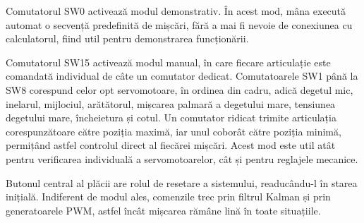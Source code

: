 Comutatorul SW0 activează modul demonstrativ. În acest mod, mâna execută automat o
secvență predefinită de mișcări, fără a mai fi nevoie de conexiunea cu calculatorul,
fiind util pentru demonstrarea funcționării.

Comutatorul SW15 activează modul manual, în care fiecare articulație este comandată
individual de câte un comutator dedicat. Comutatoarele SW1 până la SW8 corespund celor
opt servomotoare, în ordinea din cadru, adică degetul mic, inelarul, mijlociul,
arătătorul, mișcarea palmară a degetului mare, tensiunea degetului mare, încheietura și
cotul. Un comutator ridicat trimite articulația corespunzătoare către poziția maximă,
iar unul coborât către poziția minimă, permițând astfel controlul direct al fiecărei
mișcări. Acest mod este util atât pentru verificarea individuală a servomotoarelor, cât
și pentru reglajele mecanice.

Butonul central al plăcii are rolul de resetare a sistemului, readucându-l în starea
inițială. Indiferent de modul ales, comenzile trec prin filtrul Kalman și prin
generatoarele PWM, astfel încât mișcarea rămâne lină în toate situațiile.
